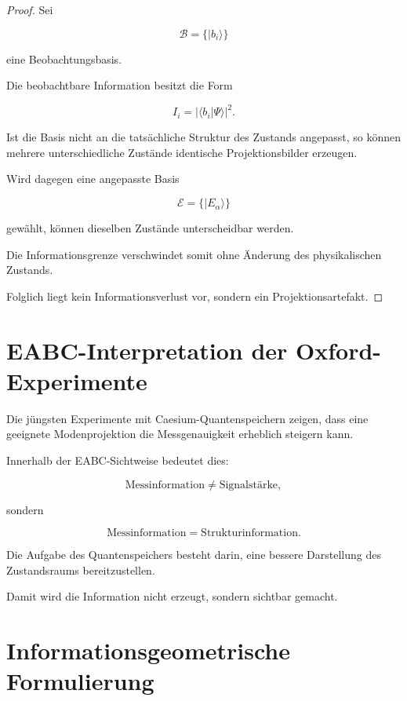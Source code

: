\documentclass[11pt,a4paper]{article}
\theoremstyle{remark}
\begin{document}
	\begin{proof}
		
		Sei
		
		\[
		\mathcal B
		=
		\{|b_i\rangle\}
		\]
		
		eine Beobachtungsbasis.
		
		Die beobachtbare Information besitzt die Form
		
		\[
		I_i
		=
		|\langle b_i|\Psi\rangle|^2.
		\]
		
		Ist die Basis nicht an die tatsächliche Struktur des Zustands angepasst,
		so können mehrere unterschiedliche Zustände identische
		Projektionsbilder erzeugen.
		
		Wird dagegen eine angepasste Basis
		
		\[
		\mathcal E
		=
		\{|E_\alpha\rangle\}
		\]
		
		gewählt, können dieselben Zustände unterscheidbar werden.
		
		Die Informationsgrenze verschwindet somit ohne Änderung des
		physikalischen Zustands.
		
		Folglich liegt kein Informationsverlust vor, sondern ein
		Projektionsartefakt.
	\end{proof}
	
	\section{EABC-Interpretation der Oxford-Experimente}
	
	Die jüngsten Experimente mit Caesium-Quantenspeichern zeigen, dass eine
	geeignete Modenprojektion die Messgenauigkeit erheblich steigern kann.
	
	Innerhalb der EABC-Sichtweise bedeutet dies:
	
	\begin{equation}
		\text{Messinformation}
		\neq
		\text{Signalstärke},
	\end{equation}
	
	sondern
	
	\begin{equation}
		\text{Messinformation}
		=
		\text{Strukturinformation}.
	\end{equation}
	
	Die Aufgabe des Quantenspeichers besteht darin, eine bessere
	Darstellung des Zustandsraums bereitzustellen.
	
	Damit wird die Information nicht erzeugt, sondern sichtbar gemacht.
	
	\section{Informationsgeometrische Formulierung}
	
\end{document}
